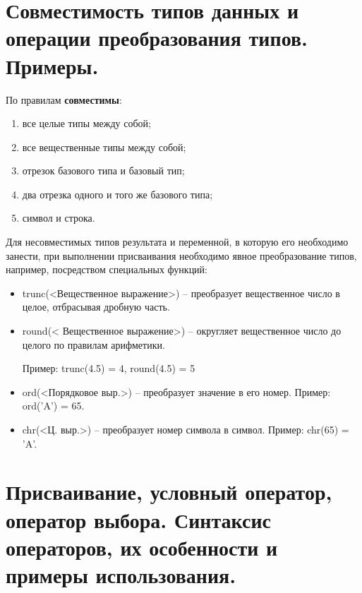 
\newpage\section{Совместимость типов данных и операции преобразования типов. Примеры. }

\begin{myquote}
    
\end{myquote}

По правилам {\bf{совместимы}}:
\begin{enumerate}
    \item все целые типы между собой;
    \item все вещественные типы между собой;
    \item отрезок базового типа и базовый тип;
    \item два отрезка одного и того же базового типа;
    \item символ и строка.
\end{enumerate}

Для несовместимых типов результата и переменной, в которую его необходимо занести, при выполнении присваивания необходимо явное преобразование типов, например, посредством специальных функций:
\begin{itemize}
\item trunc(<Вещественное выражение>) – преобразует вещественное число в целое, отбрасывая дробную часть.

\item round(< Вещественное выражение>) – округляет вещественное число до целого по правилам арифметики.

Пример:   trunc(4.5) = 4,    round(4.5) = 5 

\item ord(<Порядковое выр.>) – преобразует значение в его номер.
Пример:   ord(’A’)  = 65.

\item chr(<Ц. выр.>) – преобразует номер символа в символ.
Пример:   chr(65) = ’A’.
\end{itemize}




\newpage\section{Присваивание, условный оператор, оператор выбора. Синтаксис операторов, их особенности и примеры использования. }

